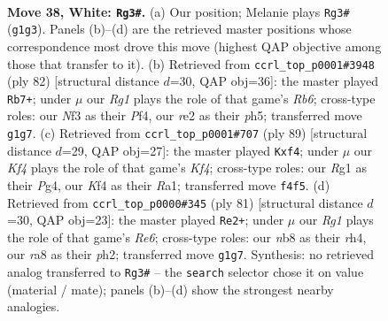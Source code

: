 \documentclass[11pt]{article}
\begin{document}
\clearpage

\begin{figure}[p]\centering
\begin{subfigure}{0.46\textwidth}\centering
\resizebox{\linewidth}{!}{%
\newchessgame
\chessboard[
  setfen={rn6/8/8/5p1p/5K2/pP3N1k/4r3/6R1 w - - 2 38},
  showmover=false,
  pgfstyle=straightmove, color=movearrow, markmove={g1-g3}
]}
\caption{}
\end{subfigure}\hfill
\begin{subfigure}{0.46\textwidth}\centering
\resizebox{\linewidth}{!}{%
\newchessgame
\chessboard[
  setfen={8/5k2/1R6/p2pKp1p/5P2/7r/2P5/8 w - - 6 42},
  showmover=false,
  pgfstyle=straightmove, color=movearrow, markmove={b6-b7}
]}
\caption{}
\end{subfigure}
\\[4pt]
\begin{subfigure}{0.46\textwidth}\centering
\resizebox{\linewidth}{!}{%
\newchessgame
\chessboard[
  setfen={8/8/7R/5k2/3PnPp1/8/4K2P/r3B3 b - - 0 45},
  showmover=false,
  pgfstyle=straightmove, color=movearrow, markmove={f5-f4}
]}
\caption{}
\end{subfigure}\hfill
\begin{subfigure}{0.46\textwidth}\centering
\resizebox{\linewidth}{!}{%
\newchessgame
\chessboard[
  setfen={8/8/2k5/1nP5/1P5R/4r3/1K5P/8 b - - 6 41},
  showmover=false,
  pgfstyle=straightmove, color=movearrow, markmove={e3-e2}
]}
\caption{}
\end{subfigure}
\caption{\textbf{Move 38, White: \texttt{Rg3\#}.} (a) Our position; Melanie plays \texttt{Rg3\#} (\texttt{g1g3}). Panels (b)--(d) are the retrieved master positions whose correspondence most drove this move (highest QAP objective among those that transfer to it). (b) Retrieved from \texttt{ccrl\_top\_p0001\#3948} (ply 82) [structural distance $d$=30, QAP obj=36]: the master played \texttt{Rb7+}; under $\mu$ our \emph{Rg1} plays the role of that game's \emph{Rb6}; cross-type roles: our \emph{N}f3 as their \emph{P}f4, our \emph{r}e2 as their \emph{p}h5; transferred move \texttt{g1g7}. (c) Retrieved from \texttt{ccrl\_top\_p0001\#707} (ply 89) [structural distance $d$=29, QAP obj=27]: the master played \texttt{Kxf4}; under $\mu$ our \emph{Kf4} plays the role of that game's \emph{Kf4}; cross-type roles: our \emph{R}g1 as their \emph{P}g4, our \emph{K}f4 as their \emph{R}a1; transferred move \texttt{f4f5}. (d) Retrieved from \texttt{ccrl\_top\_p0000\#345} (ply 81) [structural distance $d$=30, QAP obj=23]: the master played \texttt{Re2+}; under $\mu$ our \emph{Rg1} plays the role of that game's \emph{Re6}; cross-type roles: our \emph{n}b8 as their \emph{r}h4, our \emph{r}a8 as their \emph{p}h2; transferred move \texttt{g1g7}. Synthesis: no retrieved analog transferred to \texttt{Rg3\#} -- the \texttt{search} selector chose it on value (material / mate); panels (b)--(d) show the strongest nearby analogies.}
\label{fig:thought-m74}
\end{figure}
\end{document}

